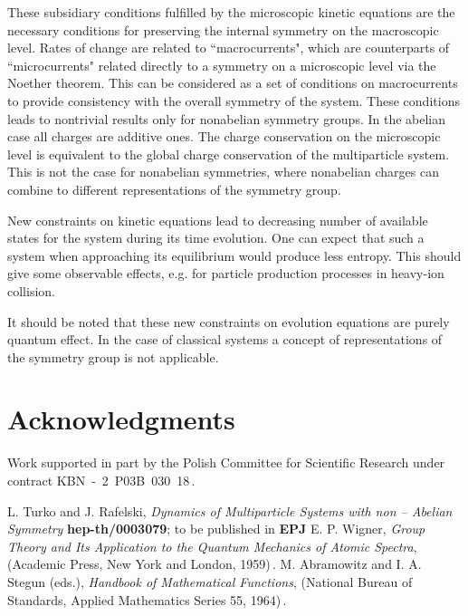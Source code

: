 \documentclass[a4paper]{article}
\begin{document}
These subsidiary conditions fulfilled by the microscopic kinetic
equations are the necessary conditions for preserving the internal
symmetry on the macroscopic level. Rates of change \coordHE{} are related to
``macrocurrents", which are counterparts of ``microcurrents"
related directly to a symmetry on a microscopic level via the
Noether theorem. This can be considered as a set of conditions on
macrocurrents to provide consistency with the overall symmetry of
the system. These conditions leads to nontrivial results only for
nonabelian symmetry groups. In the abelian case all charges are
additive ones. The charge conservation on the microscopic level is
equivalent to the global charge conservation of the multiparticle
system. This is not the case for nonabelian symmetries, where
nonabelian charges can combine to different representations of the
symmetry group.

New constraints on kinetic equations lead to decreasing number of
available states for the system during its time evolution. One can
expect that such a system when approaching its equilibrium would
produce less entropy. This should give some observable effects,
e.g. for particle production processes in heavy-ion collision.

It should be noted that these new constraints on evolution
equations are purely quantum effect. In the case of classical
systems a concept of representations of the symmetry group is not
applicable.

\pagebreak
\section*{Acknowledgments}
Work supported in part by the Polish Committee for Scientific
Research under contract KBN~-~2~P03B~030~18\,.

\begin{thebibliography}{55}
 L. Turko and J. Rafelski, {\it Dynamics of
Multiparticle Systems with non -- Abelian Symmetry} {\bf
hep-th/0003079}; to be published in {\bf EPJ}
E. P. Wigner, {\it Group Theory and Its Application to the Quantum
Mechanics of Atomic Spectra}, (Academic Press, New York and
London, 1959)\,.
 M. Abramowitz and I. A. Stegun (eds.), {\it Handbook of
Mathematical Functions}, (National Bureau of Standards, Applied
Mathematics Series \myHighlight{$\cdot$}\coordHE{}  55, 1964)\,.
\end{thebibliography}
\end{document}
